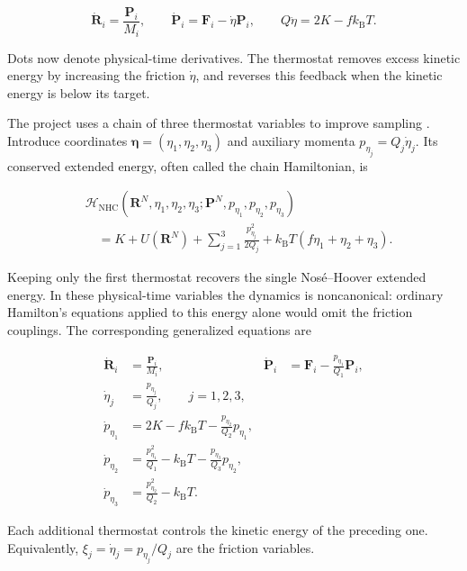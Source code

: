 \documentclass[12pt,a4paper]{article}
\numberwithin{equation}{section}
\begin{document}
\begin{equation}
  \dot{\bm R}_i=\frac{\bm P_i}{M_i},\qquad
  \dot{\bm P}_i=\bm F_i-\dot\eta\bm P_i,\qquad
  Q\ddot\eta=2K-f k_{\mathrm B}T.
  \label{eq:nose-hoover-physical-time}
\end{equation}

Dots now denote physical-time derivatives. The thermostat removes excess
kinetic energy by increasing the friction $\dot\eta$, and reverses this
feedback when the kinetic energy is below its target.

The project uses a chain of three thermostat variables to improve sampling
\cite{nhc}. Introduce coordinates $\bm\eta=(\eta_1,\eta_2,\eta_3)$ and
auxiliary momenta $p_{\eta_j}=Q_j\dot\eta_j$. Its conserved extended
energy, often called the chain Hamiltonian, is

\begin{equation}
  \begin{aligned}
    &\mathcal H_{\mathrm{NHC}}(\bm R^N,\eta_1,\eta_2,\eta_3;
                             \bm P^N,p_{\eta_1},p_{\eta_2},p_{\eta_3})\\
    &\quad=K+U(\bm R^N)+\sum_{j=1}^{3}\frac{p_{\eta_j}^2}{2Q_j}
      +k_{\mathrm B}T(f\eta_1+\eta_2+\eta_3).
  \end{aligned}
  \label{eq:thermostat-chain-energy}
\end{equation}

Keeping only the first thermostat recovers the single Nos\'e--Hoover
extended energy. In these physical-time variables the dynamics is
noncanonical: ordinary Hamilton's equations applied to this energy alone
would omit the friction couplings. The corresponding generalized equations
are

\begin{align}
  \dot{\bm R}_i&=\frac{\bm P_i}{M_i},
    &\dot{\bm P}_i&=\bm F_i-\frac{p_{\eta_1}}{Q_1}\bm P_i,\\
  \dot\eta_j&=\frac{p_{\eta_j}}{Q_j},\qquad j=1,2,3,\\
  \dot p_{\eta_1}&=2K-f k_{\mathrm B}T
                    -\frac{p_{\eta_2}}{Q_2}p_{\eta_1},\\
  \dot p_{\eta_2}&=\frac{p_{\eta_1}^2}{Q_1}-k_{\mathrm B}T
                    -\frac{p_{\eta_3}}{Q_3}p_{\eta_2},\\
  \dot p_{\eta_3}&=\frac{p_{\eta_2}^2}{Q_2}-k_{\mathrm B}T.
  \label{eq:thermostat-chain}
\end{align}

Each additional thermostat controls the kinetic energy of the preceding
one. Equivalently, $\xi_j=\dot\eta_j=p_{\eta_j}/Q_j$ are the friction
variables.
\end{document}
